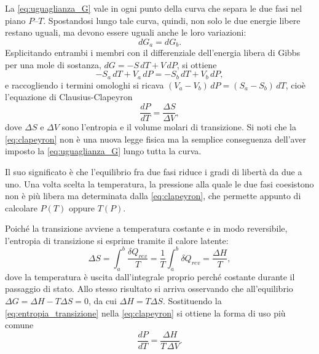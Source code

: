 La \eqref{eq:uguaglianza_G} vale in ogni punto della curva che separa le due fasi nel piano $P$--$T$.
Spostandosi lungo tale curva, quindi, non solo le due energie libere restano uguali, ma devono essere uguali anche le loro variazioni:
\begin{equation}
    dG_a = dG_b .
    \label{eq:uguaglianza_dG}
\end{equation}
Esplicitando entrambi i membri con il differenziale dell'energia libera di Gibbs per una mole di sostanza, $dG = -S\,dT + V\,dP$, si ottiene
\begin{equation}
    -S_a\,dT + V_a\,dP = -S_b\,dT + V_b\,dP ,
    \label{eq:clapeyron_esplicita}
\end{equation}
e raccogliendo i termini omologhi si ricava $(V_a - V_b)\,dP = (S_a - S_b)\,dT$, cioè l'equazione di Clausius-Clapeyron
\begin{equation}
    \frac{dP}{dT} = \frac{\Delta S}{\Delta V} ,
    \label{eq:clapeyron}
\end{equation}
dove $\Delta S$ e $\Delta V$ sono l'entropia e il volume molari di transizione.
Si noti che la \eqref{eq:clapeyron} non è una nuova legge fisica ma la semplice conseguenza dell'aver imposto la \eqref{eq:uguaglianza_G} lungo tutta la curva.
 
Il suo significato è che l'equilibrio fra due fasi riduce i gradi di libertà da due a uno.
Una volta scelta la temperatura, la pressione alla quale le due fasi coesistono non è più libera ma determinata dalla \eqref{eq:clapeyron}, che permette appunto di calcolare $P(T)$ oppure $T(P)$.
 
Poiché la transizione avviene a temperatura costante e in modo reversibile, l'entropia di transizione si esprime tramite il calore latente:
\begin{equation}
    \Delta S = \int_a^b \frac{\delta Q_{rev}}{T} = \frac{1}{T}\int_a^b \delta Q_{rev} = \frac{\Delta H}{T} ,
    \label{eq:entropia_transizione}
\end{equation}
dove la temperatura è uscita dall'integrale proprio perché costante durante il passaggio di stato.
Allo stesso risultato si arriva osservando che all'equilibrio $\Delta G = \Delta H - T\Delta S = 0$, da cui $\Delta H = T\Delta S$.
Sostituendo la \eqref{eq:entropia_transizione} nella \eqref{eq:clapeyron} si ottiene la forma di uso più comune
\begin{equation}
    \frac{dP}{dT} = \frac{\Delta H}{T\,\Delta V} .
    \label{eq:clapeyron_entalpica}
\end{equation}
 
